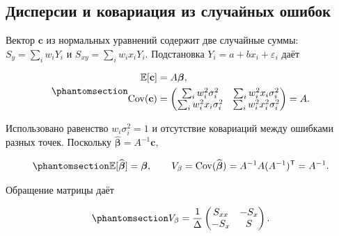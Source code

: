 \documentclass[
  russian,
  11pt,
  a4paper,
  open=any]{scrbook}
\begin{document}
\begin{bookderivation}

\subsection{Дисперсии и ковариация из случайных
ошибок}\label{ux434ux438ux441ux43fux435ux440ux441ux438ux438-ux438-ux43aux43eux432ux430ux440ux438ux430ux446ux438ux44f-ux438ux437-ux441ux43bux443ux447ux430ux439ux43dux44bux445-ux43eux448ux438ux431ux43eux43a}

Вектор \(\mathbf c\) из нормальных уравнений содержит две случайные
суммы: \(S_y=\sum_iw_iY_i\) и \(S_{xy}=\sum_iw_ix_iY_i\). Подстановка
\(Y_i=a+bx_i+\varepsilon_i\) даёт

\begin{equation}\protect\phantomsection\label{eq-ch11-normal-equation-moments}{
\begin{aligned}
\mathbb E[\mathbf c]&=A\boldsymbol\beta,\\
\operatorname{Cov}(\mathbf c)&=
\begin{pmatrix}
\sum_iw_i^2\sigma_i^2&\sum_iw_i^2x_i\sigma_i^2\\
\sum_iw_i^2x_i\sigma_i^2&\sum_iw_i^2x_i^2\sigma_i^2
\end{pmatrix}
=A.
\end{aligned}
}\end{equation}

Использовано равенство \(w_i\sigma_i^2=1\) и отсутствие ковариаций между
ошибками разных точек. Поскольку
\(\widehat{\boldsymbol\beta}=A^{-1}\mathbf c\),

\begin{equation}\protect\phantomsection\label{eq-ch11-line-estimator-moments}{
\mathbb E[\widehat{\boldsymbol\beta}]=\boldsymbol\beta,
\qquad
V_\beta=\operatorname{Cov}(\widehat{\boldsymbol\beta})
=A^{-1}A(A^{-1})^{\mathsf T}=A^{-1}.
}\end{equation}

Обращение матрицы даёт

\begin{equation}\protect\phantomsection\label{eq-ch11-line-parameter-covariance}{
V_\beta=\frac1\Delta
\begin{pmatrix}S_{xx}&-S_x\\-S_x&S\end{pmatrix}.
}\end{equation}

\end{bookderivation}
\end{document}
